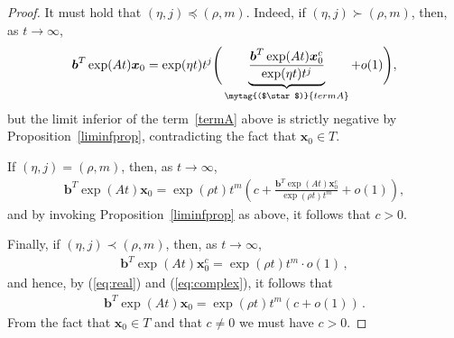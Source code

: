 \begin{proof}


It must hold that $(\eta,j)\preceq (\rho,m)$.  Indeed, if $(\eta,j)\succ
(\rho,m)$, then, as $t\rightarrow\infty$,
\begin{align*}
\boldsymbol{b}^{T} \exp(At) \boldsymbol{x}_{0} = \exp(\eta t)t^{j} \Bigg(
\underbrace{\frac{\boldsymbol{b}^{T} \exp(At) \boldsymbol{x}_{0}^{c}}{\exp(\eta t)t^{j}}}_{\mytag{($\star$)}{termA}} + o(1)\Bigg) ,
\end{align*}
%
but the limit inferior of the term~\ref{termA} above is strictly
negative by Proposition~\ref{liminfprop}, contradicting the fact that
$\boldsymbol{x}_{0}\in\mathit{T}$.

If $(\eta,j)=(\rho,m)$, then, as $t\rightarrow\infty$,
\begin{align*}
\boldsymbol{b}^{T} \exp(At) \boldsymbol{x}_{0} = \exp(\rho t)t^{m} \left( c + \frac{\boldsymbol{b}^{T} \exp(At) \boldsymbol{x}_{0}^{c}}{\exp(\rho t)t^{m}} + o(1) \right) ,
\end{align*}
and by invoking Proposition~\ref{liminfprop} as above, it follows that
$c > 0$.

Finally, if $(\eta,j)\prec (\rho,m)$, then, as $t\rightarrow\infty$,
\begin{gather}\boldsymbol{b}^{T} \exp(At) \boldsymbol{x}_{0}^c =
\exp(\rho t)t^{m} \cdot o(1) \, ,
\label{eq:complex}
\end{gather} and hence, by (\ref{eq:real}) and (\ref{eq:complex}), it
follows that
\begin{align*}
\boldsymbol{b}^{T} \exp(At) \boldsymbol{x}_{0} = \exp(\rho t)t^{m} \left( c +o(1) \right) \, .
\end{align*}
From the fact that $\boldsymbol{x}_{0} \in T$ and that $c\neq 0$ we must have $c>0$.


\end{proof}
